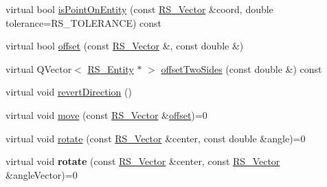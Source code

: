 \begin{DoxyCompactItemize}
\item 
virtual bool \hyperlink{classRS__Entity_ac790f68bb498adbbd881f58bec171f9e}{is\-Point\-On\-Entity} (const \hyperlink{classRS__Vector}{R\-S\-\_\-\-Vector} \&coord, double tolerance=R\-S\-\_\-\-T\-O\-L\-E\-R\-A\-N\-C\-E) const 
\item 
virtual bool \hyperlink{classRS__Entity_aa296d21b9aac99161d386ce2f60f0fea}{offset} (const \hyperlink{classRS__Vector}{R\-S\-\_\-\-Vector} \&, const double \&)
\item 
virtual Q\-Vector$<$ \hyperlink{classRS__Entity}{R\-S\-\_\-\-Entity} $\ast$ $>$ \hyperlink{classRS__Entity_a72f35358a0298af0365309258601c547}{offset\-Two\-Sides} (const double \&) const 
\item 
virtual void \hyperlink{classRS__Entity_aca203ede0d82969f193e98521263a645}{revert\-Direction} ()
\item 
virtual void \hyperlink{classRS__Entity_a476ae29bd4069b351b4ec2aa196b6497}{move} (const \hyperlink{classRS__Vector}{R\-S\-\_\-\-Vector} \&\hyperlink{classRS__Entity_aa296d21b9aac99161d386ce2f60f0fea}{offset})=0
\item 
virtual void \hyperlink{classRS__Entity_a9e29d3ff157de1cc6152fe2c08161dae}{rotate} (const \hyperlink{classRS__Vector}{R\-S\-\_\-\-Vector} \&center, const double \&angle)=0
\item 
\hypertarget{classRS__Entity_a6bf933d24affd0bf4bac677963b2a835}{virtual void {\bfseries rotate} (const \hyperlink{classRS__Vector}{R\-S\-\_\-\-Vector} \&center, const \hyperlink{classRS__Vector}{R\-S\-\_\-\-Vector} \&angle\-Vector)=0}\label{classRS__Entity_a6bf933d24affd0bf4bac677963b2a835}


\end{DoxyCompactItemize}
